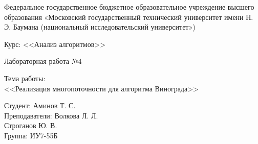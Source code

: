 \documentclass[a4paper,14pt]{article}
\begin{document}



\large
\begin{center}
Федеральное государственное бюджетное образовательное учреждение высшего образования «Московский государственный технический университет имени Н. Э. Баумана (национальный исследовательский университет»)
\end{center}

\vspace*{30mm} 

\LARGE
\begin{center}
Курс: <<Анализ алгоритмов>>

Лабораторная работа №4
\end{center}

\vspace*{30mm} 

\huge
\begin{center}
Тема работы:\\
<<Реализация многопоточности для алгоритма Винограда>>
\end{center}
\vspace*{30mm} 

\large
\begin{flushright}
Студент: Аминов Т. С. \\
Преподаватели: Волкова Л. Л. \\
				Строганов Ю. В. \\
Группа: ИУ7-55Б
\end{flushright}
\end{document}
